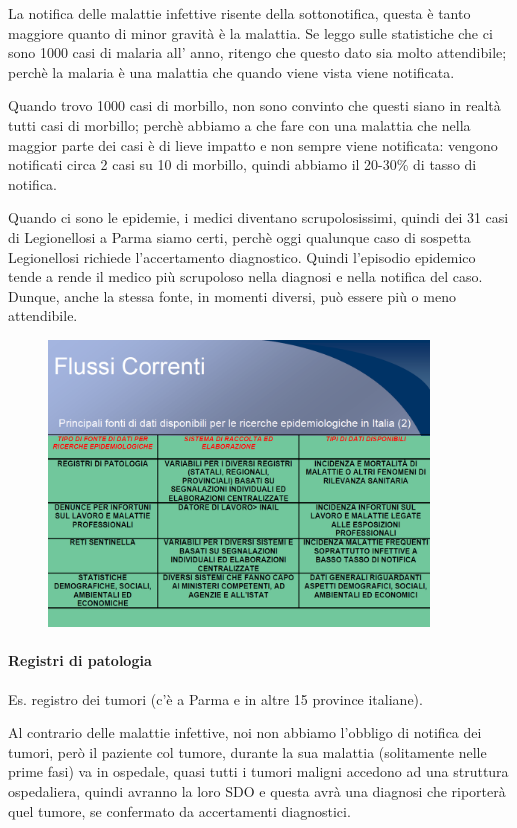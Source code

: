 La notifica delle malattie infettive risente della sottonotifica, questa
è tanto maggiore quanto di minor gravità è la malattia. Se leggo sulle
statistiche che ci sono 1000 casi di malaria all' anno, ritengo che
questo dato sia molto attendibile; perchè la malaria è una malattia che
quando viene vista viene notificata.

Quando trovo 1000 casi di morbillo, non sono convinto che questi siano
in realtà tutti casi di morbillo; perchè abbiamo a che fare con una
malattia che nella maggior parte dei casi è di lieve impatto e non
sempre viene notificata: vengono notificati circa 2 casi su 10 di
morbillo, quindi abbiamo il 20-30\% di tasso di notifica.

Quando ci sono le epidemie, i medici diventano scrupolosissimi, quindi
dei 31 casi di Legionellosi a Parma siamo certi, perchè oggi qualunque
caso di sospetta Legionellosi richiede l'accertamento diagnostico.
Quindi l'episodio epidemico tende a rende il medico più scrupoloso nella
diagnosi e nella notifica del caso. Dunque, anche la stessa fonte, in
momenti diversi, può essere più o meno attendibile.


\begin{figure}[!ht]
\centering
	\includegraphics[width=0.9\textwidth]{02/image2.png}
\end{figure}


\paragraph{Registri di patologia}


Es. registro dei tumori (c'è a Parma e in altre 15 province italiane).

Al contrario delle malattie infettive, noi non abbiamo l'obbligo di
notifica dei tumori, però il paziente col tumore, durante la sua
malattia (solitamente nelle prime fasi) va in ospedale, quasi tutti i
tumori maligni accedono ad una struttura ospedaliera, quindi avranno la
loro SDO e questa avrà una diagnosi che riporterà quel tumore, se
confermato da accertamenti diagnostici.

